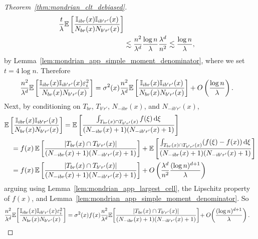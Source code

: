 \begin{proof}[Theorem~\ref{thm:mondrian_clt_debiased}]
\begin{align*}
    \frac{t}{\lambda}
    \mathbb{E} \left[
      \frac{\mathbb{I}_{i b r}(x) \mathbb{I}_{i b' r'}(x)}
      {N_{b r}(x) N_{b' r'}(x)}
    \right] \\
    &\lesssim
    \frac{n^2}{\lambda^d}
    \frac{\log n}{\lambda}
    \frac{\lambda^d}{n^2}
    \lesssim
    \frac{\log n}{\lambda},
  \end{align*}
  by Lemma~\ref{lem:mondrian_app_simple_moment_denominator},
  where we set $t = 4 \log n$.
  Therefore
  \begin{align*}
    \frac{n^2}{\lambda^d}
    \mathbb{E} \left[
      \frac{\mathbb{I}_{i b r}(x) \mathbb{I}_{i b' r'}(x) \varepsilon_i^2}
      {N_{b r}(x) N_{b' r'}(x)}
    \right]
    &=
    \sigma^2(x)
    \frac{n^2}{\lambda^d}
    \mathbb{E} \left[
      \frac{\mathbb{I}_{i b r}(x) \mathbb{I}_{i b' r'}(x)}
      {N_{b r}(x) N_{b' r'}(x)}
    \right]
    + O \left( \frac{\log n}{\lambda} \right).
  \end{align*}
  Next, by conditioning on
  $T_{b r}$, $T_{b' r'}$, $N_{-i b r}(x)$, and $N_{-i b' r'}(x)$,
  \begin{align*}
    &\mathbb{E} \left[
      \frac{\mathbb{I}_{i b r}(x) \mathbb{I}_{i b' r'}(x)}
      {N_{b r}(x) N_{b' r'}(x)}
    \right]
    = \mathbb{E} \left[
      \frac{\int_{T_{b r}(x) \cap T_{b' r'}(x)} f(\xi) \,\mathrm{d}\xi}
      {(N_{-i b r}(x)+1) (N_{-i b' r'}(x)+1)}
    \right] \\
    &\quad= f(x) \,
    \mathbb{E} \left[
      \frac{|T_{b r}(x) \cap T_{b' r'}(x)|}
      {(N_{-i b r}(x)+1) (N_{-i b' r'}(x)+1)}
    \right]
    +
    \mathbb{E} \left[
      \frac{\int_{T_{b r}(x) \cap T_{b' r'}(x)}
      (f(\xi) - f(x)) \,\mathrm{d}\xi}
      {(N_{-i b r}(x)+1) (N_{-i b' r'}(x)+1)}
    \right] \\
    &\quad=
    f(x) \,
    \mathbb{E} \left[
      \frac{|T_{b r}(x) \cap T_{b' r'}(x)|}
      {(N_{-i b r}(x)+1) (N_{-i b' r'}(x)+1)}
    \right]
    + O \left(
      \frac{\lambda^d}{n^2}
      \frac{(\log n)^{d+1}}{\lambda}
    \right)
  \end{align*}
  arguing using Lemma~\ref{lem:mondrian_app_largest_cell},
  the Lipschitz property of $f(x)$,
  and Lemma~\ref{lem:mondrian_app_simple_moment_denominator}. So
  \begin{align*}
    \frac{n^2}{\lambda^d}
    \E \! \left[
      \frac{\I_{i b r}(x) \I_{i b' r'}(x) \varepsilon_i^2}
      {N_{b r}(x) N_{b' r'}(x)}
    \right]
    &=
    \sigma^2(x)
    f(x)
    \frac{n^2}{\lambda^d}
    \E \! \left[
      \frac{|T_{b r}(x) \cap T_{b' r'}(x)|}
      {(N_{-i b r}(x)+1) (N_{-i b' r'}(x)+1)}
    \right]
    \! + O \! \left(
      \frac{(\log n)^{d+1}}{\lambda}
    \right).

\end{align*}
\end{proof}
